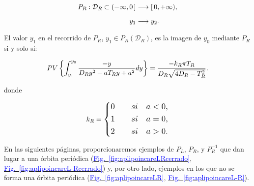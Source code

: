 \documentclass[12pt,a4paper]{report} %
\newcommand{\fref}[1]{\hyperref[#1]{\textcolor{blue}{Fig.~\ref*{#1}}}}
\newcommand{\fref}[1]{\hyperref[#1]{\textcolor{blue}{\textit{Fig.~\ref*{#1}}}}}
\begin{document}
	\begin{equation}
		\label{eq:dr}
		\scalebox{1}{$\displaystyle
			\begin{aligned}
				P_R:\mathcal{D}_R\subset (-\infty,0\,] &\longrightarrow [\,0, +\infty),\\[2mm]
				y_1 &\longrightarrow y_2.
			\end{aligned}
			$}
	\end{equation}\smallskip
	
	\noindent El valor $y_1$ en el recorrido de $P_R$, $y_1 \in P_R(\mathcal{D}_R)$, es la imagen de $y_0$ mediante $P_R$ si y solo si:
	
	\vspace{0.5cm}\begin{equation}
		\label{eq:caracr}
		\scalebox{1}{$\displaystyle
			PV\left\{\int_{y_1}^{y_0}\frac{-y}{D_Ry^2-aT_Ry+a^2}dy\right\}=\frac{-k_R\pi T_R}{D_R\sqrt{4D_R-T_R^2}}.
			$}
	\end{equation}\smallskip
	
	\noindent donde
	
	\begin{equation*}
		k_R=
		\label{eq:kr}
		\scalebox{1.2}{$\displaystyle
			\left\{
			\begin{aligned}
				0 \qquad si \quad a<0, \\
				1 \qquad si \quad a=0, \\
				2 \qquad si \quad a>0. 
			\end{aligned}
			\right. 
			$}
	\end{equation*}\smallskip
	
	\vspace{1cm}\noindent En las siguientes páginas, proporcionaremos ejemplos de $P_L$, $P_R$, y $P_R^{-1}$ que dan lugar a una órbita periódica (\fref{fig:aplipoincareLRcerrado}, \fref{fig:aplipoincareL-Rcerrado}) y, por otro lado, ejemplos en los que no se forma una órbita periódica (\fref{fig:aplipoincareLR}, \fref{fig:aplipoincareL-R}).
	
	\newpage
	
\end{document}

